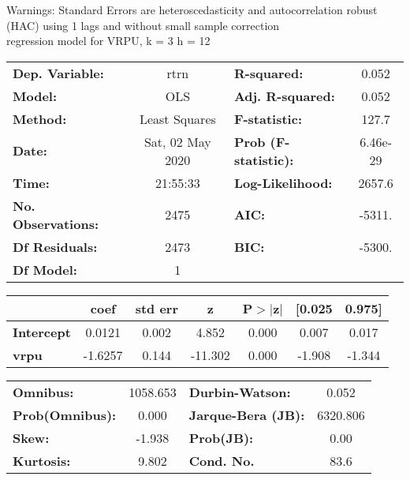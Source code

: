 Warnings: \newline
 [1] Standard Errors are heteroscedasticity and autocorrelation robust (HAC) using 1 lags and without small sample correction\\ 

regression model for VRPU, k = 3 h = 12\begin{center}
\begin{tabular}{lclc}
\toprule
\textbf{Dep. Variable:}    &       rtrn       & \textbf{  R-squared:         } &     0.052   \\
\textbf{Model:}            &       OLS        & \textbf{  Adj. R-squared:    } &     0.052   \\
\textbf{Method:}           &  Least Squares   & \textbf{  F-statistic:       } &     127.7   \\
\textbf{Date:}             & Sat, 02 May 2020 & \textbf{  Prob (F-statistic):} &  6.46e-29   \\
\textbf{Time:}             &     21:55:33     & \textbf{  Log-Likelihood:    } &    2657.6   \\
\textbf{No. Observations:} &        2475      & \textbf{  AIC:               } &    -5311.   \\
\textbf{Df Residuals:}     &        2473      & \textbf{  BIC:               } &    -5300.   \\
\textbf{Df Model:}         &           1      & \textbf{                     } &             \\
\bottomrule
\end{tabular}
\begin{tabular}{lcccccc}
                   & \textbf{coef} & \textbf{std err} & \textbf{z} & \textbf{P$> |$z$|$} & \textbf{[0.025} & \textbf{0.975]}  \\
\midrule
\textbf{Intercept} &       0.0121  &        0.002     &     4.852  &         0.000        &        0.007    &        0.017     \\
\textbf{vrpu}      &      -1.6257  &        0.144     &   -11.302  &         0.000        &       -1.908    &       -1.344     \\
\bottomrule
\end{tabular}
\begin{tabular}{lclc}
\textbf{Omnibus:}       & 1058.653 & \textbf{  Durbin-Watson:     } &    0.052  \\
\textbf{Prob(Omnibus):} &   0.000  & \textbf{  Jarque-Bera (JB):  } & 6320.806  \\
\textbf{Skew:}          &  -1.938  & \textbf{  Prob(JB):          } &     0.00  \\
\textbf{Kurtosis:}      &   9.802  & \textbf{  Cond. No.          } &     83.6  \\
\bottomrule
\end{tabular}
\end{center}

